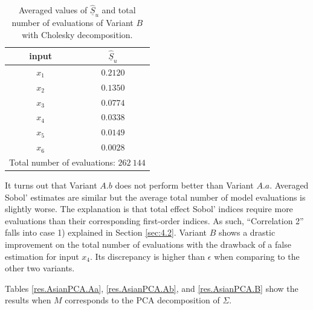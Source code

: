 \begin{table}[!ht]
\caption{Averaged values of $\widehat{\underline{S}}_u$ and total number of evaluations of Variant $B$ with Cholesky decomposition.}
 \centering
\begin{tabular}{cc}
\hline
 input & $\widehat{\underline{S}}_u$ \\ \hline
 $x_1$ & $0.2120$ \\ \hline
 $x_2$ & $0.1350$ \\ \hline
 $x_3$ & $0.0774$ \\ \hline
 $x_4$ & $0.0338$ \\ \hline
 $x_5$ & $0.0149$ \\ \hline
 $x_6$ & $0.0028$ \\ \hline \hline
\multicolumn{2}{l}{Total number of evaluations: $262 \ 144$} \\ \hline 
\end{tabular}
\label{res.AsianChol.B}
\end{table}

It turns out that Variant $A.b$ does not perform better than Variant $A.a$. Averaged Sobol' estimates are similar but the average total number of model evaluations is slightly worse. The explanation is that total effect Sobol' indices require more evaluations than their corresponding first-order indices. As such, ``Correlation 2'' falls into case 1) explained in Section \ref{sec:4.2}. Variant $B$ shows a drastic improvement on the total number of evaluations with the drawback of a false estimation for input $x_4$. Its discrepancy is higher than $\epsilon$ when comparing to the other two variants.


Tables \ref{res.AsianPCA.Aa}, \ref{res.AsianPCA.Ab}, and \ref{res.AsianPCA.B} show the results when $M$ corresponds to the PCA decomposition of $\mathsf{\Sigma}$. 

